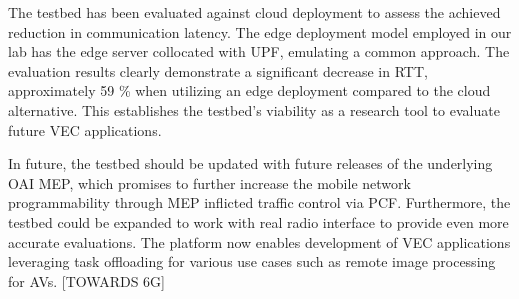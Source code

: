 \documentclass[12pt,a4paper,twoside]{report}
\begin{document}
The testbed has been evaluated against cloud deployment to assess the achieved reduction in communication latency. The edge deployment model employed in our lab has the edge server collocated with UPF, emulating a common approach. The evaluation results clearly demonstrate a significant decrease in RTT, approximately 59 \% when utilizing an edge deployment compared to the cloud alternative. This establishes the testbed’s viability as a research tool to evaluate future VEC applications. 

In future, the testbed should be updated with future releases of the underlying OAI MEP, which promises to further increase the mobile network programmability through MEP inflicted traffic control via PCF. Furthermore, the testbed could be expanded to work with real radio interface to provide even more accurate evaluations. The platform now enables development of VEC applications leveraging task offloading for various use cases such as remote image processing for AVs. [TOWARDS 6G] 

%



\clearpage

%

%
%
	
	
\end{document}
